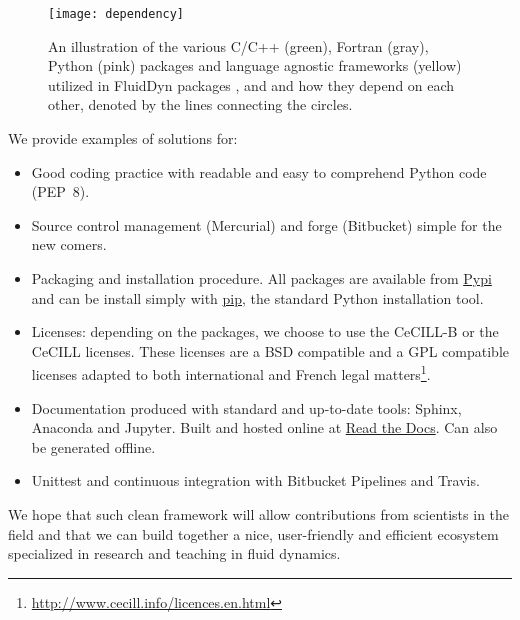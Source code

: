 \begin{figure}[h]
  \centering
  \texttt{[image: dependency]}
  \caption{An illustration of the various C/C++ (green), Fortran (gray), Python
  (pink) packages and language agnostic frameworks (yellow) utilized in
  FluidDyn packages ,  and  and
  how they depend on each other, denoted by the lines connecting the
  circles.}\label{fig:dependency}
\end{figure}

We provide examples of solutions for:
\begin{itemize}
\item Good coding practice with readable and easy to comprehend Python code
(PEP~8).
\item Source control management (Mercurial) and forge (Bitbucket) simple for
the new comers.
\item Packaging and installation procedure. All packages are available from
\href{https://pypi.org/}{Pypi} and can be install simply with
\href{https://pypi.org/project/pip/}{pip}, the standard Python installation
tool.
\item Licenses: depending on the packages, we choose to use the CeCILL-B or the
CeCILL licenses. These licenses are a BSD compatible and a GPL compatible
licenses adapted to both international and French legal
matters\footnote{\url{http://www.cecill.info/licences.en.html}}.
\item Documentation produced with standard and up-to-date tools: Sphinx,
Anaconda and Jupyter. Built and hosted online at
\href{https://readthedocs.org/}{Read the Docs}. Can also be generated offline.
\item Unittest and continuous integration with Bitbucket Pipelines and Travis.
\end{itemize}
We hope that such clean framework will allow contributions from scientists in
the field and that we can build together a nice, user-friendly and efficient
ecosystem specialized in research and teaching in fluid dynamics.



